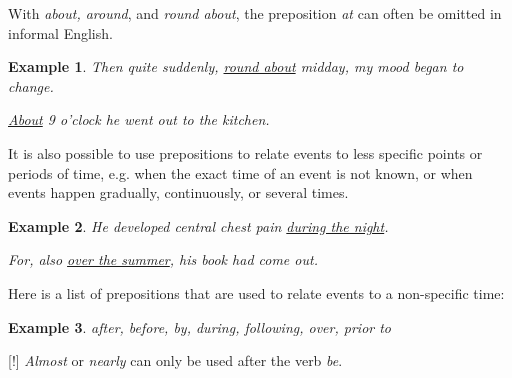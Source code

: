 \documentclass[oneside]{book}
\numberwithin{equation}{section}
\newtheorem{example}{Example}[section]
\begin{document}
With \textit{about, around}, and \textit{round about}, the preposition \textit{at} can often be omitted in informal English.
\begin{example}
    Then quite suddenly, \underline{round about} midday, my mood began to change.
    
    \underline{About} 9 o'clock he went out to the kitchen.
\end{example}
It is also possible to use prepositions to relate events to less specific points or periods of time, e.g. when the exact time of an event is not known, or when events happen gradually, continuously, or several times.
\begin{example}
    He developed central chest pain \underline{during the night}.
    
    For, also \underline{over the summer}, his book had come out.
\end{example}
Here is a list of prepositions that are used to relate events to a non-specific time:
\begin{example}
    after, before, by, during, following, over, prior to
\end{example}
%
\noindent{} [!] \textit{Almost} or \textit{nearly} can only be used after the verb \textit{be}.
\end{document}
